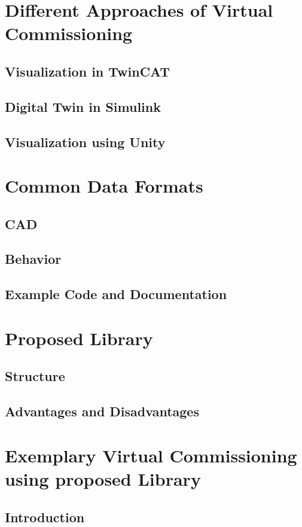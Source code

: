 \chapter{Different Approaches of Virtual Commissioning}
\section{Visualization in TwinCAT}
\section{Digital Twin in Simulink}
\section{Visualization using Unity}


\chapter{Common Data Formats}
\section{CAD}
\section{Behavior}
\section{Example Code and Documentation}

\chapter{Proposed Library}
\section{Structure}
\section{Advantages and Disadvantages}


\chapter{Exemplary Virtual Commissioning using proposed Library}
\section{Introduction}

